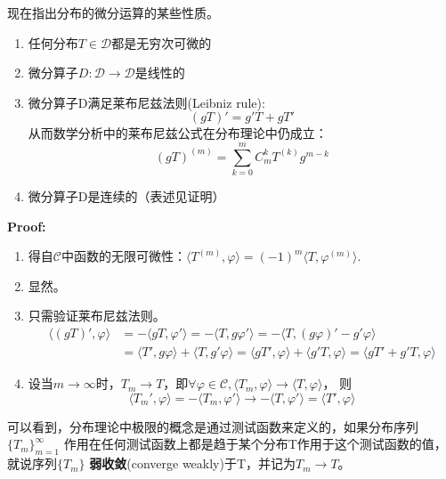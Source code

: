 \documentclass{ctexbook}
\begin{document}
现在指出分布的微分运算的某些性质。
\begin{enumerate}
    \item 任何分布$T\in\mathcal{D} $都是无穷次可微的
    \item 微分算子$D:\mathcal{D} \to\mathcal{D} $是线性的
    \item 微分算子D满足莱布尼兹法则(Leibniz rule):
          \[(gT)'=g'T+gT'\]从而数学分析中的莱布尼兹公式在分布理论中仍成立：
          \[(gT)^{(m)}=\sum_{k=0}^{m}C_m^k T^{(k)}g^{m-k}\]
    \item 微分算子D是连续的（表述见证明）
\end{enumerate}
\textbf{Proof:}\begin{enumerate}
    \item 得自$\mathcal{C} $中函数的无限可微性：$\langle T^{(m)},\varphi\rangle=(-1)^m\langle T,\varphi^{(m)}\rangle$.
    \item 显然。
    \item 只需验证莱布尼兹法则。
          \begin{align*}
              \langle (gT)',\varphi\rangle & =-\langle gT,\varphi'\rangle=-\langle T,g\varphi'\rangle=-\langle T,(g\varphi)'-g'\varphi\rangle                                            \\
                                           & =\langle T',g\varphi\rangle+\langle T,g'\varphi\rangle=\langle gT',\varphi\rangle+\langle g'T,\varphi\rangle=\langle gT'+g'T,\varphi\rangle
          \end{align*}
    \item 设当$m\to\infty$时，$T_m\to T$，即$\forall\varphi\in\mathcal{C} ,\langle T_m,\varphi\rangle\to\langle T,\varphi\rangle$，
          则\[\langle T_m',\varphi\rangle=-\langle T_m,\varphi'\rangle\to-\langle T,\varphi'\rangle=\langle T',\varphi\rangle\]
\end{enumerate}
可以看到，分布理论中极限的概念是通过测试函数来定义的，如果分布序列$\{T_m\}_{m=1}^{\infty}$
作用在任何测试函数上都是趋于某个分布T作用于这个测试函数的值，就说序列$\{T_m\}$
\textbf{弱收敛}(converge weakly)于T，并记为$T_m\to T$。
\end{document}
